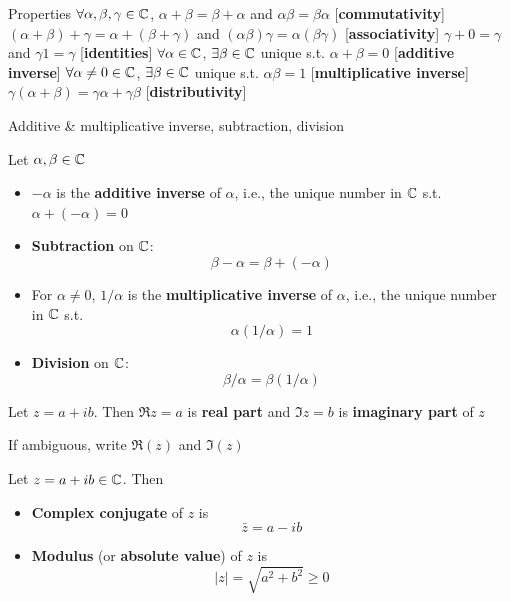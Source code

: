\documentclass[aspectratio=169]{beamer}\usepackage[]{graphicx}\usepackage[]{xcolor}
\begin{document}
\begin{frame}{Properties}
	$\forall\alpha,\beta,\gamma\in\mathbb{C}$,
	\vfill
	$\alpha+\beta=\beta+\alpha$ and $\alpha\beta=\beta\alpha$ \hfill[\textbf{commutativity}]
	\vfill
	$(\alpha+\beta)+\gamma=\alpha+(\beta+\gamma)$ and $(\alpha\beta)\gamma=\alpha(\beta\gamma)$ \hfill[\textbf{associativity}]
	\vfill
	$\gamma+0=\gamma$ and $\gamma 1=\gamma$ \hfill[\textbf{identities}]
	\vfill
	$\forall\alpha\in\mathbb{C}$, $\exists\beta\in\mathbb{C}$ unique s.t. $\alpha+\beta=0$ \hfill[\textbf{additive inverse}]
	\vfill
	$\forall \alpha\neq 0\in\mathbb{C}$, $\exists\beta\in\mathbb{C}$ unique s.t. $\alpha\beta=1$ \hfill[\textbf{multiplicative inverse}]
	\vfill
	$\gamma(\alpha+\beta)=\gamma\alpha+\gamma\beta$ \hfill[\textbf{distributivity}]
\end{frame}


\begin{frame}{Additive \& multiplicative inverse, subtraction, division}
	\begin{definition}
		Let $\alpha,\beta\in\mathbb{C}$
		\begin{itemize}
			\item $-\alpha$ is the \textbf{additive inverse} of $\alpha$, i.e., the unique number in $\mathbb{C}$ s.t. $\alpha+(-\alpha)=0$
			\item \textbf{Subtraction} on $\mathbb{C}$:
			\[
			\beta-\alpha=\beta+(-\alpha)
			\]
			\item For $\alpha\neq 0$, $1/\alpha$ is the \textbf{multiplicative inverse} of $\alpha$, i.e., the unique number in $\mathbb{C}$ s.t.
			\[
			\alpha(1/\alpha)=1
			\]
			\item \textbf{Division} on $\mathbb{C}$:
			\[
			\beta/\alpha=\beta(1/\alpha)
			\]
		\end{itemize}
	\end{definition}
\end{frame}


\begin{frame}
	\begin{definition}
		Let $z=a+ib$. Then $\Re z=a$ is \textbf{real part} and $\Im z=b$ is \textbf{imaginary part} of $z$
	\end{definition}
	\vfill
	If ambiguous, write $\Re(z)$ and $\Im(z)$
	\vfill
	\begin{definition}
		Let $z=a+ib\in\mathbb{C}$. Then
		\begin{itemize}
			\item \textbf{Complex conjugate} of $z$ is
			\[
			\bar z = a-ib
			\]
			\item \textbf{Modulus} (or \textbf{absolute value}) of $z$ is
			\[
			|z|=\sqrt{a^2+b^2} \geq 0
			\]
		\end{itemize}
	\end{definition}
\end{frame}
\end{document}
